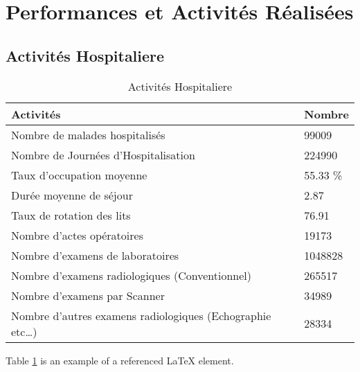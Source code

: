 \newpage
\section{Performances et Activités Réalisées}
\subsection{Activités Hospitaliere}
\begin{table}[h!]
\begin{center}
\begin{tabular}{|p{11cm}|p{2cm}|}
\hline
Activités	                                               &Nombre\\
\hline
Nombre de malades hospitalisés	                         &99009\\
Nombre de Journées d’Hospitalisation	                   &224990\\
Taux d’occupation moyenne	                               &55.33 \%\\
Durée moyenne de séjour	                                 &2.87\\
Taux de rotation des lits	                               &76.91\\
Nombre d’actes opératoires	                             &19173\\
Nombre d’examens de laboratoires	                       &1048828\\
Nombre d’examens radiologiques (Conventionnel)	         &265517\\
Nombre d’examens par Scanner	                           &34989\\
Nombre d’autres examens radiologiques (Echographie etc…) &28334\\
\hline
\end{tabular}
\end{center}
\caption{Activités Hospitaliere}
\label{table:6}
\end{table}
Table \ref{table:6} is an example of a referenced \LaTeX{} element.

